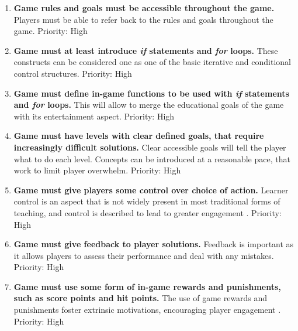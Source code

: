 \documentclass[a4paper,11.5pt]{report}
\numberwithin{figure}{section}
\numberwithin{table}{section}
\numberwithin{equation}{section}
\numberwithin{equation}{section}
\begin{document}
\begin{enumerate}[label=3.2.\arabic*]

  \item \textbf{Game rules and goals must be accessible throughout the game.} Players must be able to refer back to the rules and goals throughout the game. \newline Priority: High

  \item \textbf{Game must at least introduce \textit{if} statements and \textit{for} loops.} These constructs can be considered one as one of the basic iterative and conditional control structures. \newline Priority: High
  
  \item \textbf{Game must define in-game functions to be used with \textit{if} statements and \textit{for} loops.} This will allow to merge the educational goals of the game with its entertainment aspect. \newline Priority: High
  
  \item \textbf{Game must have levels with clear defined goals, that require increasingly difficult solutions.} Clear accessible goals will tell the player what to do each level. Concepts can be introduced at a reasonable pace, that work to limit player overwhelm. \newline Priority: High
  
  \item \textbf{Game must give players some control over choice of action.} Learner control is an aspect that is not widely present in most traditional forms of teaching, and control is described to lead to greater engagement \citep{whitton2011}. \newline Priority: High

  \item \textbf{Game must give feedback to player solutions.} Feedback is important as it allows players to assess their performance and deal with any mistakes. \newline Priority: High
  
  \item \textbf{Game must use some form of in-game rewards and punishments, such as score points and hit points.} The use of game rewards and punishments foster extrinsic motivations, encouraging player engagement \citep{roungas2015}. \newline Priority: High
  

\end{enumerate}
\end{document}
